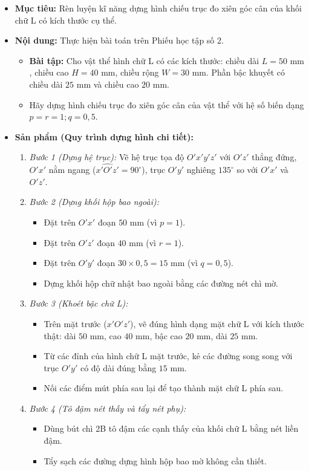 \documentclass[12pt, a4paper]{article}
\begin{document}
\begin{itemize}[leftmargin=1.2cm]
    \item[a)] \textbf{Mục tiêu:} Rèn luyện kĩ năng dựng hình chiếu trục đo xiên góc cân của khối chữ L có kích thước cụ thể.
    \item[b)] \textbf{Nội dung:} Thực hiện bài toán trên Phiếu học tập số 2.
    \begin{itemize}[leftmargin=0.6cm]
        \item \textbf{Bài tập:} Cho vật thể hình chữ L có các kích thước: chiều dài $L = 50\text{ mm}$, chiều cao $H = 40\text{ mm}$, chiều rộng $W = 30\text{ mm}$. Phần bậc khuyết có chiều dài $25\text{ mm}$ và chiều cao $20\text{ mm}$.
        \item Hãy dựng hình chiếu trục đo xiên góc cân của vật thể với hệ số biến dạng $p = r = 1; q = 0{,}5$.
    \end{itemize}

    \item[c)] \textbf{Sản phẩm (Quy trình dựng hình chi tiết):}
    \begin{enumerate}[leftmargin=0.6cm]
        \item \textit{Bước 1 (Dựng hệ trục):} Vẽ hệ trục tọa độ $O'x'y'z'$ với $O'z'$ thẳng đứng, $O'x'$ nằm ngang ($\widehat{x'O'z'} = 90^\circ$), trục $O'y'$ nghiêng $135^\circ$ so với $O'x'$ và $O'z'$.
        \item \textit{Bước 2 (Dựng khối hộp bao ngoài):}
        \begin{itemize}
            \item Đặt trên $O'x'$ đoạn $50\text{ mm}$ (vì $p = 1$).
            \item Đặt trên $O'z'$ đoạn $40\text{ mm}$ (vì $r = 1$).
            \item Đặt trên $O'y'$ đoạn $30 \times 0{,}5 = 15\text{ mm}$ (vì $q = 0{,}5$).
            \item Dựng khối hộp chữ nhật bao ngoài bằng các đường nét chì mờ.
        \end{itemize}
        \item \textit{Bước 3 (Khoét bậc chữ L):}
        \begin{itemize}
            \item Trên mặt trước ($x'O'z'$), vẽ đúng hình dạng mặt chữ L với kích thước thật: dài $50\text{ mm}$, cao $40\text{ mm}$, bậc cao $20\text{ mm}$, dài $25\text{ mm}$.
            \item Từ các đỉnh của hình chữ L mặt trước, kẻ các đường song song với trục $O'y'$ có độ dài đúng bằng $15\text{ mm}$.
            \item Nối các điểm mút phía sau lại để tạo thành mặt chữ L phía sau.
        \end{itemize}
        \item \textit{Bước 4 (Tô đậm nét thấy và tẩy nét phụ):}
        \begin{itemize}
            \item Dùng bút chì 2B tô đậm các cạnh thấy của khối chữ L bằng nét liền đậm.
            \item Tẩy sạch các đường dựng hình hộp bao mờ không cần thiết.
        \end{itemize}
    \end{enumerate}


\end{itemize}
\end{document}

